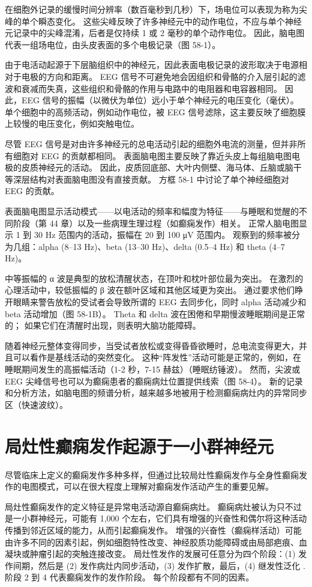 在细胞外记录的缓慢时间分辨率（数百毫秒到几秒）下，场电位可以表现为称为尖峰的单个瞬态变化。 这些尖峰反映了许多神经元中的动作电位，不应与单个神经元记录中的尖峰混淆，后者是仅持续 1 或 2 毫秒的单个动作电位。 因此，脑电图代表一组场电位，由头皮表面的多个电极记录（图 58-1）。

由于电活动起源于下层脑组织中的神经元，因此表面电极记录的波形取决于电源相对于电极的方向和距离。 EEG 信号不可避免地会因组织和骨骼的介入层引起的滤波和衰减而失真，这些组织和骨骼的作用与电路中的电阻器和电容器相同。 因此，EEG 信号的振幅（以微伏为单位）远小于单个神经元的电压变化（毫伏）。 单个细胞中的高频活动，例如动作电位，被 EEG 信号滤除，这主要反映了细胞膜上较慢的电压变化，例如突触电位。

尽管 EEG 信号是对由许多神经元的总电活动引起的细胞外电流的测量，但并非所有细胞对 EEG 的贡献都相同。 表面脑电图主要反映了靠近头皮上每组脑电图电极的皮质神经元的活动。 因此，皮质回底部、大叶内侧壁、海马体、丘脑或脑干等深层结构对表面脑电图没有直接贡献。 方框 58-1 中讨论了单个神经细胞对 EEG 的贡献。

表面脑电图显示活动模式——以电活动的频率和幅度为特征——与睡眠和觉醒的不同阶段（第 44 章）以及一些病理生理过程（如癫痫发作）相关。 正常人脑电图显示 1 到 30 Hz 范围内的活动，振幅在 20 到 100 μV 范围内。 观察到的频率被分为几组：alpha (8–13 Hz)、beta (13–30 Hz)、delta (0.5–4 Hz) 和 theta (4–7 Hz)。

中等振幅的 α 波是典型的放松清醒状态，在顶叶和枕叶部位最为突出。 在激烈的心理活动中，较低振幅的 β 波在额叶区域和其他区域更为突出。 通过要求他们睁开眼睛来警告放松的受试者会导致所谓的 EEG 去同步化，同时 alpha 活动减少和 beta 活动增加（图 58-1B）。 Theta 和 delta 波在困倦和早期慢波睡眠期间是正常的； 如果它们在清醒时出现，则表明大脑功能障碍。

随着神经元整体变得同步，当受试者放松或变得昏昏欲睡时，总电流变得更大，并且可以看作是基线活动的突然变化。 这种“阵发性”活动可能是正常的，例如，在睡眠期间发生的高振幅活动（1-2 秒，7-15 赫兹）（睡眠纺锤波）。 然而，尖波或 EEG 尖峰信号也可以为癫痫患者的癫痫病灶位置提供线索（图 58-4）。 新的记录和分析方法，如脑电图的频谱分析，越来越多地被用于检测癫痫病灶内的异常同步区（快速波纹）。


\section{局灶性癫痫发作起源于一小群神经元}
尽管临床上定义的癫痫发作多种多样，但通过比较局灶性癫痫发作与全身性癫痫发作的电图模式，可以在很大程度上理解对癫痫发作活动产生的重要见解。

局灶性癫痫发作的定义特征是异常电活动源自癫痫病灶。 癫痫病灶被认为只不过是一小群神经元，可能有 1,000 个左右，它们具有增强的兴奋性和偶尔将这种活动传播到邻近区域的能力，从而引起癫痫发作。 增强的兴奋性（癫痫样活动）可能由许多不同的因素引起，例如细胞特性改变、神经胶质功能障碍或由局部疤痕、血凝块或肿瘤引起的突触连接改变。 局灶性发作的发展可任意分为四个阶段：(1) 发作间期，然后是 (2) 发作病灶内同步活动，(3) 发作扩散，最后，(4) 继发性泛化 . 阶段 2 到 4 代表癫痫发作的发作阶段。 每个阶段都有不同的因素。


